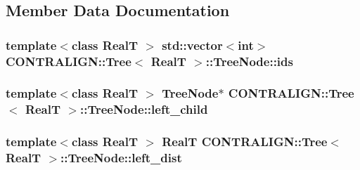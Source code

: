 \subsection{Member Data Documentation}
\hypertarget{struct_c_o_n_t_r_a_l_i_g_n_1_1_tree_1_1_tree_node_af0ba8bc52781c6857f116f17f8c5ca14}{
\subsubsection[{ids}]{\setlength{\rightskip}{0pt plus 5cm}template$<$class Real\+T $>$ std\+::vector$<$int$>$ {\bf C\+O\+N\+T\+R\+A\+L\+I\+G\+N\+::\+Tree}$<$ Real\+T $>$\+::Tree\+Node\+::ids}}\label{struct_c_o_n_t_r_a_l_i_g_n_1_1_tree_1_1_tree_node_af0ba8bc52781c6857f116f17f8c5ca14}
\hypertarget{struct_c_o_n_t_r_a_l_i_g_n_1_1_tree_1_1_tree_node_acf53eb4bc788a05fa2f53d61ec7384e9}{
\subsubsection[{left\+\_\+child}]{\setlength{\rightskip}{0pt plus 5cm}template$<$class Real\+T $>$ {\bf Tree\+Node}$\ast$ {\bf C\+O\+N\+T\+R\+A\+L\+I\+G\+N\+::\+Tree}$<$ Real\+T $>$\+::Tree\+Node\+::left\+\_\+child}}\label{struct_c_o_n_t_r_a_l_i_g_n_1_1_tree_1_1_tree_node_acf53eb4bc788a05fa2f53d61ec7384e9}
\hypertarget{struct_c_o_n_t_r_a_l_i_g_n_1_1_tree_1_1_tree_node_a0ab61d516eb4bba0c92d77f793e22103}{
\subsubsection[{left\+\_\+dist}]{\setlength{\rightskip}{0pt plus 5cm}template$<$class Real\+T $>$ Real\+T {\bf C\+O\+N\+T\+R\+A\+L\+I\+G\+N\+::\+Tree}$<$ Real\+T $>$\+::Tree\+Node\+::left\+\_\+dist}}\label{struct_c_o_n_t_r_a_l_i_g_n_1_1_tree_1_1_tree_node_a0ab61d516eb4bba0c92d77f793e22103}
